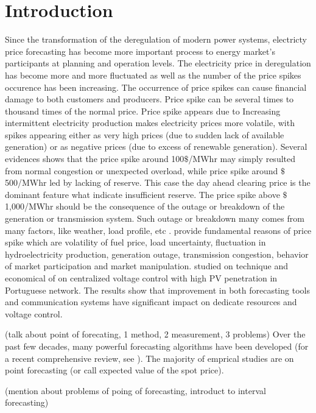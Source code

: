 \documentclass[review]{elsarticle}
\begin{document}
\linenumbers

\section{Introduction}

  Since the transformation of the deregulation of modern power systems, electricty price forecasting has become more important process to energy market's participants at planning and operation levels. The electricity price in deregulation has become more and more fluctuated as well as the number of the price spikes occurence has been increasing. The occurrence of price spikes can cause financial damage to both customers and producers. Price spike can be several times to thousand times of the normal price. Price spike appears due to Increasing intermittent electricity production makes electricity prices more volatile, with spikes appearing either as very high prices (due to sudden lack of available generation) or as negative prices (due to excess of renewable generation). Several evidences shows that the price spike around 100$\$$/MWhr may simply resulted from normal congestion or unexpected overload, while price spike around $\$$500/MWhr led by lacking of reserve. This case the day ahead clearing price is the dominant feature what indicate insufficient reserve. The price spike above $\$$1,000/MWhr should be the consequence of the outage or breakdown of the generation or transmission system. Such outage or breakdown many comes from many factors, like weather, load profile, etc  \cite{He2016}. \cite{SINGHAL2011550} provide fundamental reasons of price spike which are volatility of fuel price, load uncertainty, fluctuation in hydroelectricity production, generation outage, transmission congestion, behavior of market participation and market manipulation. \cite{GONZALEZSOTRES2017338} studied on technique and economical of on centralized voltage control with high PV penetration in Portuguese network. The results show that improvement in both forecasting tools and communication systems have significant impact on dedicate resources and voltage control.



  (talk about point of forecating, 1 method, 2 measurement, 3 problems) Over the past few decades, many powerful forecasting algorithms have been developed (for a recent comprehensive review, see \cite{Weron2014}). The majority of emprical studies are on point forecasting (or call expected value of the spot price).

  (mention about problems of poing of forecasting, introduct to interval forecasting)
\end{document}
